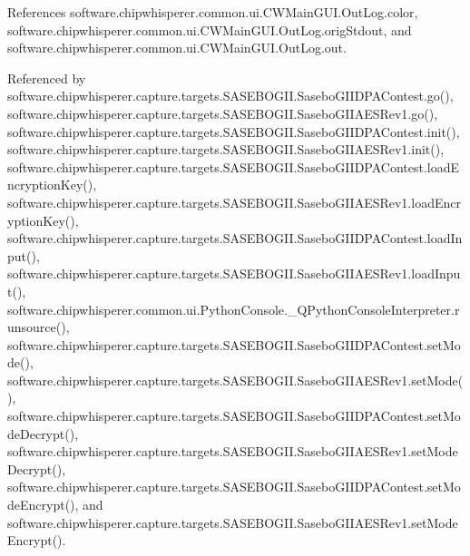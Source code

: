 References software.\+chipwhisperer.\+common.\+ui.\+C\+W\+Main\+G\+U\+I.\+Out\+Log.\+color, software.\+chipwhisperer.\+common.\+ui.\+C\+W\+Main\+G\+U\+I.\+Out\+Log.\+orig\+Stdout, and software.\+chipwhisperer.\+common.\+ui.\+C\+W\+Main\+G\+U\+I.\+Out\+Log.\+out.



Referenced by software.\+chipwhisperer.\+capture.\+targets.\+S\+A\+S\+E\+B\+O\+G\+I\+I.\+Sasebo\+G\+I\+I\+D\+P\+A\+Contest.\+go(), software.\+chipwhisperer.\+capture.\+targets.\+S\+A\+S\+E\+B\+O\+G\+I\+I.\+Sasebo\+G\+I\+I\+A\+E\+S\+Rev1.\+go(), software.\+chipwhisperer.\+capture.\+targets.\+S\+A\+S\+E\+B\+O\+G\+I\+I.\+Sasebo\+G\+I\+I\+D\+P\+A\+Contest.\+init(), software.\+chipwhisperer.\+capture.\+targets.\+S\+A\+S\+E\+B\+O\+G\+I\+I.\+Sasebo\+G\+I\+I\+A\+E\+S\+Rev1.\+init(), software.\+chipwhisperer.\+capture.\+targets.\+S\+A\+S\+E\+B\+O\+G\+I\+I.\+Sasebo\+G\+I\+I\+D\+P\+A\+Contest.\+load\+Encryption\+Key(), software.\+chipwhisperer.\+capture.\+targets.\+S\+A\+S\+E\+B\+O\+G\+I\+I.\+Sasebo\+G\+I\+I\+A\+E\+S\+Rev1.\+load\+Encryption\+Key(), software.\+chipwhisperer.\+capture.\+targets.\+S\+A\+S\+E\+B\+O\+G\+I\+I.\+Sasebo\+G\+I\+I\+D\+P\+A\+Contest.\+load\+Input(), software.\+chipwhisperer.\+capture.\+targets.\+S\+A\+S\+E\+B\+O\+G\+I\+I.\+Sasebo\+G\+I\+I\+A\+E\+S\+Rev1.\+load\+Input(), software.\+chipwhisperer.\+common.\+ui.\+Python\+Console.\+\_\+\+Q\+Python\+Console\+Interpreter.\+runsource(), software.\+chipwhisperer.\+capture.\+targets.\+S\+A\+S\+E\+B\+O\+G\+I\+I.\+Sasebo\+G\+I\+I\+D\+P\+A\+Contest.\+set\+Mode(), software.\+chipwhisperer.\+capture.\+targets.\+S\+A\+S\+E\+B\+O\+G\+I\+I.\+Sasebo\+G\+I\+I\+A\+E\+S\+Rev1.\+set\+Mode(), software.\+chipwhisperer.\+capture.\+targets.\+S\+A\+S\+E\+B\+O\+G\+I\+I.\+Sasebo\+G\+I\+I\+D\+P\+A\+Contest.\+set\+Mode\+Decrypt(), software.\+chipwhisperer.\+capture.\+targets.\+S\+A\+S\+E\+B\+O\+G\+I\+I.\+Sasebo\+G\+I\+I\+A\+E\+S\+Rev1.\+set\+Mode\+Decrypt(), software.\+chipwhisperer.\+capture.\+targets.\+S\+A\+S\+E\+B\+O\+G\+I\+I.\+Sasebo\+G\+I\+I\+D\+P\+A\+Contest.\+set\+Mode\+Encrypt(), and software.\+chipwhisperer.\+capture.\+targets.\+S\+A\+S\+E\+B\+O\+G\+I\+I.\+Sasebo\+G\+I\+I\+A\+E\+S\+Rev1.\+set\+Mode\+Encrypt().


